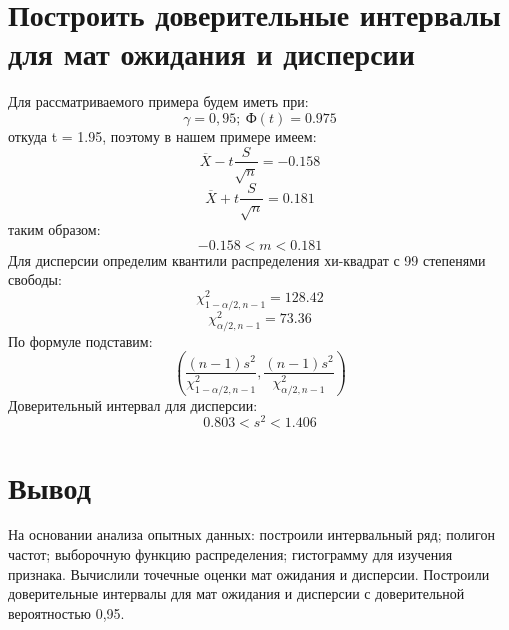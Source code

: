 \documentclass{article}
\begin{document}
\section{Построить доверительные интервалы для мат ожидания и дисперсии}
Для рассматриваемого примера будем иметь при:
\[\gamma = 0,95;\ \text{Ф}(t) = 0.975\]
откуда t = 1.95, поэтому в нашем примере имеем:
\[\overline{X}-t\frac{S}{\sqrt{n}} = -0.158\]
\[\overline{X}+t\frac{S}{\sqrt{n}} = 0.181\]
таким образом:
\[-0.158 < m < 0.181\]
Для дисперсии определим квантили распределения хи-квадрат с 99 степенями свободы:
\[
\chi^2_{1-\alpha/2, n-1} = 128.42
\]
\[
\chi^2_{\alpha/2, n-1} = 73.36
\]
По формуле подставим:
\[
\left( \frac{{(n-1)s^2}}{{\chi^2_{1-\alpha/2, n-1}}}, \frac{{(n-1)s^2}}{{\chi^2_{\alpha/2, n-1}}} \right)
\]
Доверительный интервал для дисперсии:
\[0.803 < s^2 < 1.406\]
\section*{Вывод}
На основании анализа опытных данных: построили интервальный ряд; полигон частот; выборочную функцию распределения; гистограмму для изучения признака.
Вычислили точечные оценки мат ожидания и дисперсии.
Построили доверительные интервалы для мат ожидания и дисперсии с доверительной вероятностью 0,95.
\end{document}
